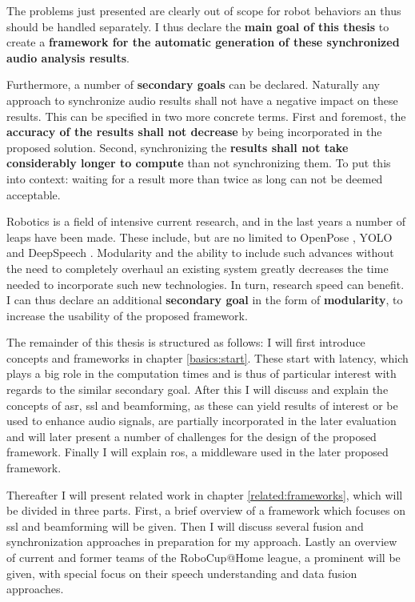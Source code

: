 The problems just presented are clearly out of scope for robot behaviors an thus should be handled separately.
I thus declare the \textbf{main goal of this thesis} to create a \textbf{framework for the automatic generation of these synchronized audio analysis results}.

Furthermore, a number of \textbf{secondary goals} can be declared.
Naturally any approach to synchronize audio results shall not have a negative impact on these results.
This can be specified in two more concrete terms.
First and foremost, the \textbf{accuracy of the results shall not decrease} by being incorporated in the proposed solution.
Second, synchronizing the \textbf{results shall not take considerably longer to compute} than not synchronizing them.
To put this into context: waiting for a result more than twice as long can not be deemed acceptable.


Robotics is a field of intensive current research, and in the last years a number of leaps have been made.
These include, but are no limited to OpenPose \cite{cao2018openpose}, YOLO \cite{yolov3} and DeepSpeech \cite{deepspeech}.
Modularity and the ability to include such advances without the need to completely overhaul an existing system greatly decreases the time needed to incorporate such new technologies.
In turn, research speed can benefit.
I can thus declare an additional \textbf{secondary goal} in the form of \textbf{modularity}, to increase the usability of the proposed framework.


The remainder of this thesis is structured as follows:
I will first introduce concepts and frameworks in chapter \ref{basics:start}.
These start with latency, which plays a big role in the computation times and is thus of particular interest with regards to the similar secondary goal.
After this I will discuss and explain the concepts of \gls{asr}, \gls{ssl} and beamforming, as these can yield results of interest or be used to enhance audio signals, are partially incorporated in the later evaluation and will later present a number of challenges for the design of the proposed framework.
Finally I will explain \gls{ros}, a middleware used in the later proposed framework.

Thereafter I will present related work in chapter \ref{related:frameworks}, which will be divided in three parts.
First, a brief overview of a framework which focuses on \gls{ssl} and beamforming will be given.
Then I will discuss several fusion and synchronization approaches in preparation for my approach.
Lastly an overview of current and former teams of the RoboCup@Home league, a prominent will be given, with special focus on their speech understanding and data fusion approaches.

